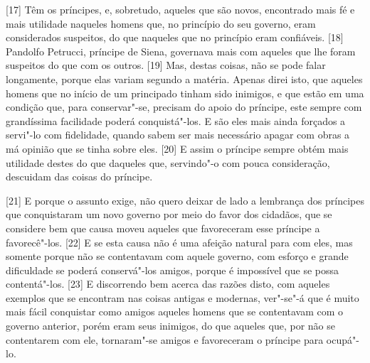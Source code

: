 {[}17{]} Têm os príncipes, e, sobretudo, aqueles que são novos,
encontrado mais fé e mais utilidade naqueles homens que, no princípio do
seu governo, eram considerados suspeitos, do que naqueles que no
princípio eram confiáveis. {[}18{]} Pandolfo Petrucci,
príncipe de Siena, governava mais com aqueles que lhe foram suspeitos do
que com os outros. {[}19{]} Mas, destas coisas, não se pode falar
longamente, porque elas variam segundo a matéria. Apenas direi isto, que
aqueles homens que no início de um principado tinham sido inimigos, e
que estão em uma condição que, para conservar"-se, precisam do apoio do
príncipe, este sempre com grandíssima facilidade poderá conquistá"-los. E
são eles mais ainda forçados a servi"-lo com fidelidade, quando sabem ser
mais necessário apagar com obras a má opinião que se tinha sobre eles.
{[}20{]} E assim o príncipe sempre obtém mais utilidade destes do que
daqueles que, servindo"-o com pouca consideração, descuidam das coisas do
príncipe.

{[}21{]} E porque o assunto exige, não quero deixar de lado a
lembrança dos príncipes que conquistaram um novo governo por meio do
favor dos cidadãos, que se considere bem que causa moveu aqueles que
favoreceram esse príncipe a favorecê"-los. {[}22{]} E se esta causa não é uma afeição natural para
com eles, mas somente porque não se contentavam com aquele governo, com
esforço e grande dificuldade se poderá conservá"-los amigos, porque é
impossível que se possa contentá"-los. {[}23{]} E discorrendo bem acerca
das razões disto, com aqueles exemplos que se encontram nas coisas
antigas e modernas, ver"-se"-á que é muito mais fácil conquistar como
amigos aqueles homens que se contentavam com o governo anterior, porém
eram seus inimigos, do que aqueles que, por não se contentarem com ele,
tornaram"-se amigos e favoreceram o príncipe para ocupá"-lo.


